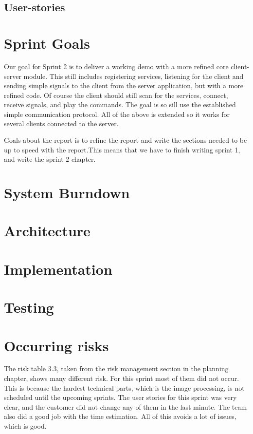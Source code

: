 \subsection{User-stories}

\section{Sprint Goals}
Our goal for Sprint 2 is to deliver a working demo with a more refined core client-server module. 
This still includes registering services, listening for the client and sending simple signals to the client from the server application, but with a more refined code. Of course the client should still scan for the services, connect, receive signals, and play the commands. 
The goal is so sill use the established simple communication protocol. All of the above is extended so it works for several clients connected to the server.

Goals about the report is to refine the report and write the sections needed to be up to speed with the report.This means that we have to finish writing sprint 1, and write the sprint 2 chapter. 

\section{System Burndown}
\section{Architecture}
\section{Implementation}
\section{Testing}


\section{Occurring risks}

The risk table 3.3, taken from the risk management section in the planning chapter, shows many different risk. 
For this sprint most of them did not occur. 
This is because the hardest technical parts, which is the image processing, is not scheduled until the upcoming sprints. 
The user stories for this sprint was very clear, and the customer did not change any of them in the last minute. The team also did a good job with the time estimation. All of this avoids a lot of issues, which is good. 


